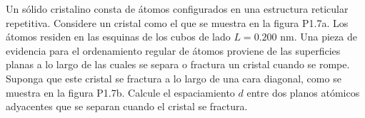\item Un sólido cristalino consta de átomos configurados en una estructura reticular repetitiva. Considere un cristal como el que se muestra en la figura P1.7a. Los átomos residen en las esquinas de los cubos de lado $L = 0.200 \text{ nm}$. Una pieza de evidencia para el ordenamiento regular de átomos proviene de las superficies planas a lo largo de las cuales se separa o fractura un cristal cuando se rompe. Suponga que este cristal se fractura a lo largo de una cara diagonal, como se muestra en la figura P1.7b. Calcule el espaciamiento $d$ entre dos planos atómicos adyacentes que se separan cuando el cristal se fractura.
